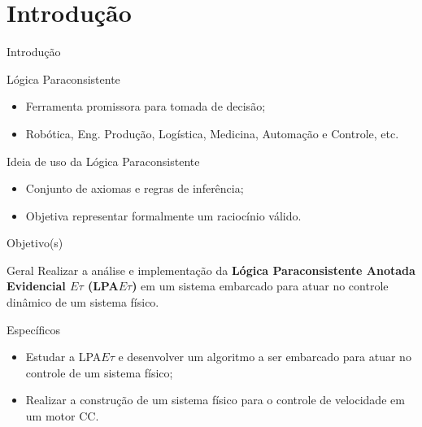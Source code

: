 \section{Introdução}
\begin{frame}{Introdução}


\begin{block}{Lógica Paraconsistente \tiny \cite{JoaoInacio}}
\begin{itemize}
\item Ferramenta promissora para tomada de decisão;
\item Robótica, Eng. Produção, Logística, Medicina, Automação e Controle, etc.
\end{itemize}
\end{block}

\begin{alertblock}{Ideia de uso da Lógica Paraconsistente \tiny \cite{JISF2011}}
\begin{itemize}
\item Conjunto de axiomas e regras de inferência;
\item Objetiva representar formalmente um raciocínio válido.
\end{itemize}
\end{alertblock}



\end{frame}


\begin{frame}{Objetivo(s)}
\begin{exampleblock}{Geral}
Realizar a análise e implementação da \textbf{ Lógica Paraconsistente Anotada Evidencial $E\tau$ (LPA$E\tau$)} em um sistema embarcado para atuar no controle dinâmico de um sistema físico.
\end{exampleblock}

\begin{alertblock}{Específicos}
  \begin{itemize}
    \item Estudar a LPA$E\tau$ e desenvolver um algoritmo a ser embarcado para atuar no controle de um sistema físico;
    \item Realizar a construção de um sistema físico para o controle de velocidade em um motor CC.
  \end{itemize}
\end{alertblock}

\end{frame}



